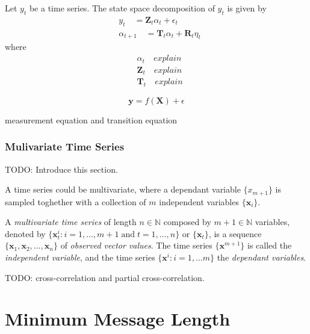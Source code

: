 \begin{definition}
Let $y_t$ be a time series. The state space decomposition of $y_t$ is given by
\begin{align*}
    & y_t          \quad = \mathbf{Z}_t \alpha_t + \epsilon_t \\
    & \alpha_{t+1} \quad = \mathbf{T}_t \alpha_t + \mathbf{R}_t \eta_t
\end{align*}
where
\begin{align*}
    & \alpha_t     \quad explain \\
    & \mathbf{Z}_t \quad explain \\
    & \mathbf{T}_t \quad explain
\end{align*}

\begin{equation}
    \label{eq:measurement_equation}
    \mathbf{y} = f\left( \mathbf{X} \right) + \epsilon
\end{equation}

measurement equation and transition equation

\end{definition}

\subsubsection{Mulivariate Time Series}

{\color{red} TODO: Introduce this section.}

A time series could be multivariate, where a dependant variable $\{ x_{m+1} \}$ is sampled toghether with a collection of $m$ independent variables $\{ \mathbf{x}_i \}$.

\begin{definition}
A \emph{multivariate time series} of length $n \in \mathbb{N}$ composed by $m+1 \in \mathbb{N}$ variables, denoted by $\{ \mathbf{x}^i_t : i=1, \ldots, m+1 \; \text{and} \; t=1, \ldots, n\}$ or $\{ \mathbf{x}_t \}$, is a sequence $\{ \mathbf{x}_1, \mathbf{x}_2, \ldots, \mathbf{x}_n \}$ of \emph{observed vector values}. The time series $\{ \mathbf{x}^{m+1} \}$ is called the \emph{independent variable}, and the time series $\{ \mathbf{x}^i : i=1, \ldots m\}$ the \emph{dependant variables}.
\end{definition}

{\color{red} TODO: cross-correlation and partial cross-correlation.}

%
%
\section{Minimum Message Length}
\label{sec:MML}


